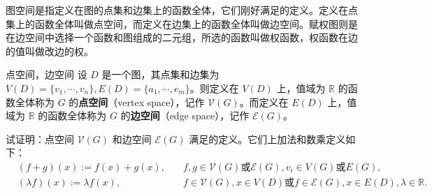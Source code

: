 
图空间是指定义在图的点集和边集上的函数全体，它们刚好满足的定义。定义在点集上的函数全体叫做点空间，而定义在边集上的函数全体叫做边空间。赋权图则是在边空间中选择一个函数和图组成的二元组，所选的函数叫做权函数，权函数在边的值叫做改边的权。

\begin{definition}{点空间，边空间}
设 $D$ 是一个图，其点集和边集为 $V(D)=\{v_1,\cdots,v_n\},E(D)=\{a_1,\cdots,e_m\}$。则定义在 $V(D)$ 上，值域为 $\mathbb R$ 的函数全体称为 $G$ 的\textbf{点空间}（vertex space），记作 $\mathcal V(G)$。而定义在 $E(D)$ 上，值域为 $\mathbb R$ 的函数全体称为 $G$ 的\textbf{边空间}（edge space），记作 $\mathcal E(G)$。
\end{definition}


\begin{exercise}{}
试证明：点空间 $\mathcal V(G)$ 和边空间 $\mathcal E(G)$ 满足的定义。它们上加法和数乘定义如下：
\begin{equation}
\begin{aligned}
&(f+g)(x):=f(x)+g(x),\quad &f,g\in\mathcal V(G)\text{或} \mathcal E(G),v_i\in V(G)\text{或} E(G),\\
&(\lambda f)(x):=\lambda f(x),\quad &f\in\mathcal V(G),x\in V(D)\text{或} f\in\mathcal E(G),x\in E(D),\lambda\in \mathbb R.
\end{aligned}~
\end{equation}

\end{exercise}










